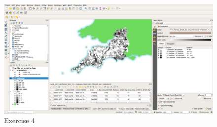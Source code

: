 \documentclass{article}
\begin{document}
\begin{figure}[!h]
	\centering
	\includegraphics[width=1\textwidth]{images/exercise_4.png}
	\caption{Exercise 4}
	\label{ft_fig_firstfig3}
\end{figure}
\end{document}
